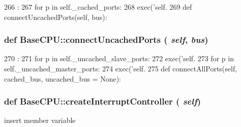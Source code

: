 \begin{DoxyCode}
266                                      :
267         for p in self._cached_ports:
268             exec('self.%
269 
    def connectUncachedPorts(self, bus):
\end{DoxyCode}
\hypertarget{namespaceBaseCPU_a40397b46bd8a3283b7c8420e0a4b800a}{
\subsubsection[{connectUncachedPorts}]{\setlength{\rightskip}{0pt plus 5cm}def BaseCPU::connectUncachedPorts ( {\em self}, \/   {\em bus})}}
\label{namespaceBaseCPU_a40397b46bd8a3283b7c8420e0a4b800a}



\begin{DoxyCode}
270                                        :
271         for p in self._uncached_slave_ports:
272             exec('self.%
273         for p in self._uncached_master_ports:
274             exec('self.%
275 
    def connectAllPorts(self, cached_bus, uncached_bus = None):
\end{DoxyCode}
\hypertarget{namespaceBaseCPU_a8257bcf9f6ddebdde3a2317f02011312}{
\subsubsection[{createInterruptController}]{\setlength{\rightskip}{0pt plus 5cm}def BaseCPU::createInterruptController ( {\em self})}}
\label{namespaceBaseCPU_a8257bcf9f6ddebdde3a2317f02011312}


insert member variable 


